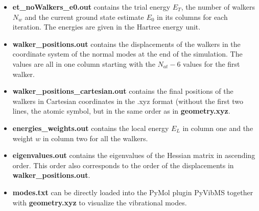 \documentclass [12pt]{report}
\begin{document}
\begin{appendices}
\begin{itemize}
\item \textbf{et\_noWalkers\_e0.out} contains the trial energy $E_T$, the number of walkers $N_w$ and the current ground state estimate $E_0$ in its columns for each iteration. The energies are given in the Hartree energy unit.
\item \textbf{walker\_positions.out} contains the displacements of the walkers in the coordinate system of the normal modes at the end of the simulation. The values are all in one column starting with the $N_{at}-6$ values for the first walker.
\item \textbf{walker\_positions\_cartesian.out} contains the final positions of the walkers in Cartesian coordinates in the .xyz format (without the first two lines, the atomic symbol, but in the same order as in \textbf{geometry.xyz}.
\item \textbf{energies\_weights.out} contains the local energy $E_L$ in column one and the weight $w$ in column two for all the walkers.
\item \textbf{eigenvalues.out} contains the eigenvalues of the Hessian matrix in ascending order. This order also corresponds to the order of the displacements in \textbf{walker\_positions.out}.
\item \textbf{modes.txt} can be directly loaded into the PyMol plugin PyVibMS \cite{PyVibMS} together with \textbf{geometry.xyz} to visualize the vibrational modes.
\end{itemize}

\end{appendices}



\end{document}
